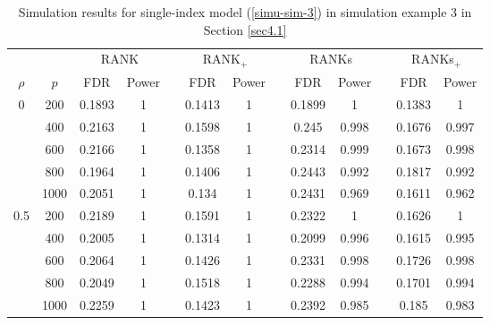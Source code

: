 \documentclass[11pt]{article}
\begin{document}
\begin{table}[htp!]
	\centering
	\caption{\label{tab-sim} Simulation results for single-index model (\ref{simu-sim-3}) in simulation example 3 in Section \ref{sec4.1}
	}
	\vskip0.2cm
	\tabcolsep 0.15cm
	\begin{tabular}{ccccccccccccc}
		\toprule
	&	&  \multicolumn{2}{c}{RANK}&&\multicolumn{2}{c}{RANK$_+$} &&\multicolumn{2}{c}{RANKs}&&\multicolumn{2}{c}{RANKs$_+$}     \\
		\cline{3-4}\cline{6-7}\cline{9-10}\cline{12-13}
$\rho$	&	$ p$ &FDR & Power &  & FDR& Power && FDR & Power &  & FDR& Power  \\
		\hline
0   & 200  & 0.1893 & 1 &  & 0.1413 & 1 &  & 0.1899 & 1     &  & 0.1383 & 1     \\
    & 400  & 0.2163 & 1 &  & 0.1598 & 1 &  & 0.245  & 0.998 &  & 0.1676 & 0.997 \\
    & 600  & 0.2166 & 1 &  & 0.1358 & 1 &  & 0.2314 & 0.999 &  & 0.1673 & 0.998 \\
    & 800  & 0.1964 & 1 &  & 0.1406 & 1 &  & 0.2443 & 0.992 &  & 0.1817 & 0.992 \\
    & 1000 & 0.2051 & 1 &  & 0.134  & 1 &  & 0.2431 & 0.969 &  & 0.1611 & 0.962 \\
0.5 & 200  & 0.2189 & 1 &  & 0.1591 & 1 &  & 0.2322 & 1     &  & 0.1626 & 1     \\
    & 400  & 0.2005 & 1 &  & 0.1314 & 1 &  & 0.2099 & 0.996 &  & 0.1615 & 0.995 \\
    & 600  & 0.2064 & 1 &  & 0.1426 & 1 &  & 0.2331 & 0.998 &  & 0.1726 & 0.998 \\
    & 800  & 0.2049 & 1 &  & 0.1518 & 1 &  & 0.2288 & 0.994 &  & 0.1701 & 0.994 \\
    & 1000 & 0.2259 & 1 &  & 0.1423 & 1 &  & 0.2392 & 0.985 &  & 0.185  & 0.983 \\
		\bottomrule
	\end{tabular}
\end{table}
\end{document}
